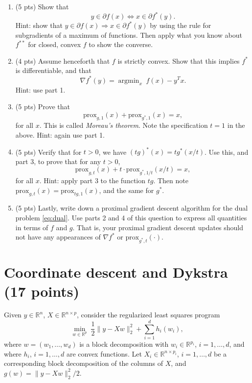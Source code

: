 \documentclass{article}
\theoremstyle{remark}
\theoremstyle{definition}
\newcommand{\argmin}{\mathop{\mathrm{argmin}}}
\def\R{\mathbb{R}}
\def\prox{\mathrm{prox}}
\begin{document}
\begin{enumerate}
\item (5 pts) Show that
  $$
  y \in \partial f(x) \iff x \in \partial f^*(y).
  $$
  Hint: show that $y \in \partial f(x) \Rightarrow x \in \partial f^*(y)$ by using
  the rule for subgradients of a maximum of functions.  Then apply what you know
  about $f^{**}$ for closed, convex $f$ to show the converse. 

\item (4 pts) Assume henceforth that $f$ is strictly convex.  Show that this
  implies $f^*$ is differentiable, and that 
  $$
  \nabla f^*(y) = \argmin_x \; f(x) - y^T x.
  $$
  Hint: use part 1.

\item (5 pts) Prove that  
  $$
  \prox_{g,1}(x) + \prox_{g^*,1}(x) = x,
  $$
  for all $x$. This is called {\it Moreau's theorem}.  Note the specification
  $t=1$ in the above.  Hint: again use part 1.  

\item (5 pts) Verify that for $t>0$, we have $(tg)^*(x) = tg^*(x/t)$.  Use this,  
  and part 3, to prove that for any $t>0$,
  $$
  \prox_{g,t}(x) + t \cdot \prox_{g^*,1/t}(x/t) = x,
  $$
  for all $x$.   Hint: apply part 3 to the function $tg$. Then note
  $\prox_{g,t}(x)=\prox_{tg,1}(x)$, and the same for $g^*$.  

\item (5 pts) Lastly, write down a proximal gradient descent algorithm for the
  dual problem \eqref{eq:dual}.   Use parts 2 and 4 of this question to express
  all quantities in terms of $f$ and $g$. That is, your proximal gradient
  descent updates should not have any appearances of $\nabla f^*$ or
  $\prox_{g^*,t}(\cdot)$.     
\end{enumerate} 

\section{Coordinate descent and Dykstra (17 points)}

Given $y \in \R^n$, $X \in \R^{n \times p}$, consider the regularized least squares program 
\begin{equation}
\label{eq:reg}
\min_{w \in \R^p} \; \frac{1}{2} \|y - Xw\|_2^2 + 
\sum_{i=1}^d h_i(w_i), 
\end{equation}
where $w = (w_1,\ldots,w_d)$ is a block decomposition with $w_i \in \R^{p_i}$,
$i=1,\ldots,d$, and where $h_i$, $i=1,\ldots,d$ are convex functions.  Let
$X_i \in \R^{n \times p_i}$, $i=1,\ldots,d$ be a corresponding block
decomposition of the columns of $X$, and $g(w) = \|y-Xw\|_2^2/2$. 
\end{document}

